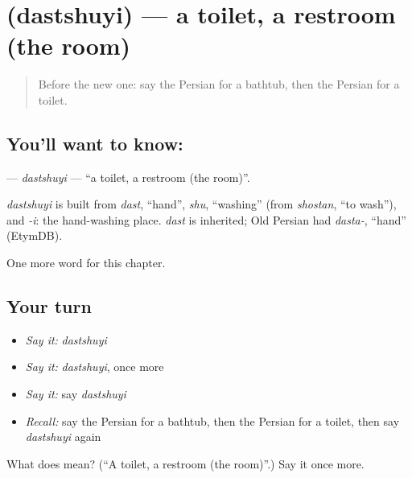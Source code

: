 \section[\texorpdfstring{\fa{دستشویی} (dastshuyi)}{دستشویی (dastshuyi)}]{ (dastshuyi) — a toilet, a restroom (the room)}

\label{lesson:FA-C165-dastshuyi}



\begin{quote}
Before the new one: say the Persian for a bathtub, then the Persian for a toilet.
\end{quote}

\subsection*{You'll want to know: }
\textbf{} — \emph{dastshuyi} — \textquotedblleft{}a toilet, a restroom (the room)\textquotedblright{}.

\begin{cousinweb}
\emph{dastshuyi} is built from \emph{dast}, \textquotedblleft{}hand\textquotedblright{}, \emph{shu}, \textquotedblleft{}washing\textquotedblright{} (from \emph{shostan}, \textquotedblleft{}to wash\textquotedblright{}), and \emph{-i}: the hand-washing place. \emph{dast} is inherited; Old Persian had \emph{dasta-}, \textquotedblleft{}hand\textquotedblright{} (EtymDB).
\end{cousinweb}

\begin{grammarlens}[title={What you've built}]
One more word for this chapter.
\end{grammarlens}

\subsection*{Your turn}
\begin{itemize}
\raggedright
  \item \emph{Say it:} \emph{dastshuyi}
  \item \emph{Say it:} \emph{dastshuyi}, once more
  \item \emph{Say it:} say \emph{dastshuyi}
  \item \emph{Recall:} say the Persian for a bathtub, then the Persian for a toilet, then say \emph{dastshuyi} again
\end{itemize}

\begin{tcolorbox}[breakable,colback=teal!4,colframe=teal!35!black,title={Before you move on}]
What does  mean? (\textquotedblleft{}A toilet, a restroom (the room)\textquotedblright{}.) Say it once more.
\end{tcolorbox}
